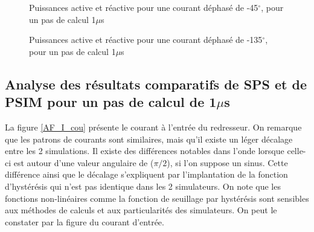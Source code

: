 \begin{figure}[htb]
\caption{Puissances active et réactive pour une courant déphasé de -45$^\circ$, pour un pas de calcul 1$\mu$s}
\label{AF_I_pui__45}
\end{figure}

\begin{figure}[htb]
\caption{Puissances active et réactive pour une courant déphasé de -135$^\circ$, pour un pas de calcul 1$\mu$s}
\label{AF_I_pui__135}
\end{figure}


\clearpage

\subsection{Analyse des résultats comparatifs de SPS et de PSIM pour un pas de calcul de 1$\mu$s}
La figure \ref{AF_I_cou} présente le courant à l'entrée du redresseur. On remarque que les patrons de courants sont similaires, mais qu'il existe un léger décalage entre les 2 simulations. Il existe des différences notables dans l'onde lorsque celle-ci est autour d'une valeur angulaire de ($\pi/2$), si l'on suppose un sinus. Cette différence ainsi que le décalage s'expliquent par l'implantation de la fonction d'hystérésis qui n'est pas identique dans les 2 simulateurs. On note que les fonctions non-linéaires comme la fonction de seuillage par hystérésis sont sensibles aux méthodes de calculs et aux particularités des simulateurs. On peut le constater par la figure du courant d'entrée.

